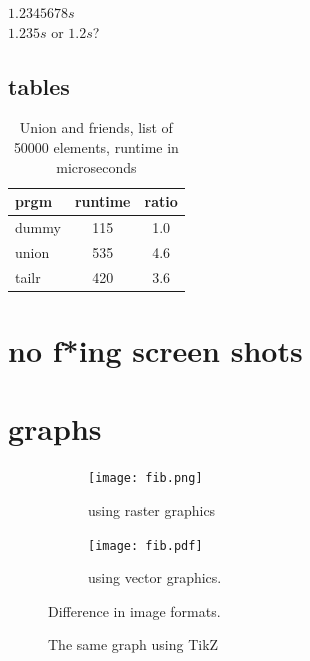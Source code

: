 \documentclass[a4paper,11pt]{article}
\begin{document}
$1.2345678 s$ \\
$1.235 s$ or $1.2 s$?

\subsection*{tables}

\begin{table}[h]
\begin{center}
\begin{tabular}{l|c|c}
\textbf{prgm} & \textbf{runtime} & \textbf{ratio}\\
\hline
  dummy      &  115 &     1.0\\
  union      &  535 &     4.6\\
  tailr      &  420 &     3.6\\
\end{tabular}
\caption{Union and friends, list of 50000 elements, runtime in microseconds}
\label{tab:table1}
\end{center}
\end{table}

\section*{no f*ing screen shots}

\section*{graphs}

\begin{figure}[h]
  \centering
  \begin{subfigure}{.5\textwidth}
    \centering
    \texttt{[image: fib.png]}
    \caption{using raster graphics}
  \end{subfigure}%
  \begin{subfigure}{.5\textwidth}
    \centering
    \texttt{[image: fib.pdf]}
    \caption{using vector graphics.}
  \end{subfigure}
  \caption{Difference in image formats.}
  \label{fig:images}
\end{figure}

\begin{figure}
  \centering
  \caption{The same graph using TikZ}
  \label{fig:tikz}
\end{figure}
\end{document}
